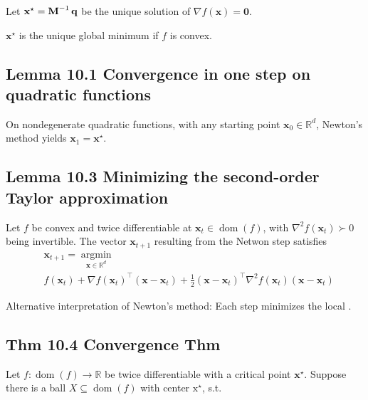 Let $\mathbf{x}^{\star}=\operatorname{\boldsymbol{\mathbf{M}}}^{-1} \mathbf{q}$ be the unique solution of $\nabla f(\mathbf{x})=\mathbf{0}$.

$\mathbf{x}^{\star}$ is the unique global minimum if $f$ is convex.






\subsection*{Lemma 10.1 Convergence in one step on quadratic functions}
On nondegenerate quadratic functions, with any starting point $\mathbf{x}_{0} \in \mathbb{R}^{d}$, Newton's method yields $\mathbf{x}_{1}=\mathbf{x}^{\star}$.







\subsection*{Lemma 10.3 Minimizing the second-order Taylor approximation}
Let $f$ be convex and twice differentiable at $\mathbf{x}_{t} \in \operatorname{dom}(f)$, with $\nabla^{2} f\left(\mathbf{x}_{t}\right) \succ 0$ being invertible. The vector $\mathbf{x}_{t+1}$ resulting from the Netwon step satisfies
$$
\begin{aligned}
&\mathbf{x}_{t+1}=\underset{\mathbf{x} \in \mathbb{R}^{d}}{\operatorname{argmin}}\\
&f\left(\mathbf{x}_{t}\right)+\nabla f\left(\mathbf{x}_{t}\right)^{\top}\left(\mathbf{x}-\mathbf{x}_{t}\right)+\frac{1}{2}\left(\mathbf{x}-\mathbf{x}_{t}\right)^{\top} \nabla^{2} f\left(\mathbf{x}_{t}\right)\left(\mathbf{x}-\mathbf{x}_{t}\right)
\end{aligned}
$$


Alternative interpretation of Newton's method: Each step minimizes the local .






\subsection*{Thm 10.4 Convergence Thm}
Let $f: \operatorname{dom}(f) \rightarrow \mathbb{R}$ be twice differentiable with a critical point $\mathbf{x}^{\star}$. Suppose there is a ball $X \subseteq \operatorname{dom}(f)$ with center $\mathrm{x}^{\star}$, s.t.

